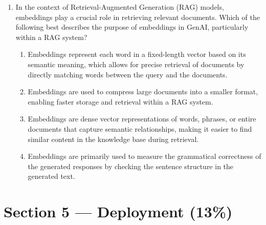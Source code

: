 \begin{enumerate}[resume,leftmargin=*]
\item In the context of Retrieval-Augmented Generation (RAG) models, embeddings play a crucial role in retrieving relevant documents. Which of the following best describes the purpose of embeddings in GenAI, particularly within a RAG system?
\begin{enumerate}[label=\Alph*.]
  \item Embeddings represent each word in a fixed-length vector based on its semantic meaning, which allows for precise retrieval of documents by directly matching words between the query and the documents.
  \item Embeddings are used to compress large documents into a smaller format, enabling faster storage and retrieval within a RAG system.
  \item Embeddings are dense vector representations of words, phrases, or entire documents that capture semantic relationships, making it easier to find similar content in the knowledge base during retrieval.
  \item Embeddings are primarily used to measure the grammatical correctness of the generated responses by checking the sentence structure in the generated text.
\end{enumerate}
\end{enumerate}

\section*{Section 5 --- Deployment (13\%)}

